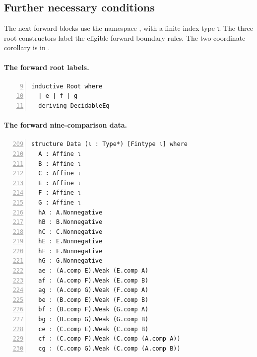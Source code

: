 
\subsection*{Further necessary conditions}

The next forward blocks use the namespace
, with a finite index type
{\leanappendixfont ι}. The three root constructors label the eligible forward
boundary rules. The two-coordinate corollary is in
.

\paragraph{The forward root labels.}\mbox{}\par
{}\par
\begin{Verbatim}[formatcom=\leanappendixfont,fontsize=\scriptsize,numbers=left,firstnumber=9,numbersep=5pt,xleftmargin=18pt]
inductive Root where
  | e | f | g
  deriving DecidableEq
\end{Verbatim}

\paragraph{The forward nine-comparison data.}\mbox{}\par
{}\par
\begin{Verbatim}[formatcom=\leanappendixfont,fontsize=\scriptsize,numbers=left,firstnumber=209,numbersep=5pt,xleftmargin=18pt]
structure Data (ι : Type*) [Fintype ι] where
  A : Affine ι
  B : Affine ι
  C : Affine ι
  E : Affine ι
  F : Affine ι
  G : Affine ι
  hA : A.Nonnegative
  hB : B.Nonnegative
  hC : C.Nonnegative
  hE : E.Nonnegative
  hF : F.Nonnegative
  hG : G.Nonnegative
  ae : (A.comp E).Weak (E.comp A)
  af : (A.comp F).Weak (E.comp B)
  ag : (A.comp G).Weak (F.comp A)
  be : (B.comp E).Weak (F.comp B)
  bf : (B.comp F).Weak (G.comp A)
  bg : (B.comp G).Weak (G.comp B)
  ce : (C.comp E).Weak (C.comp B)
  cf : (C.comp F).Weak (C.comp (A.comp A))
  cg : (C.comp G).Weak (C.comp (A.comp B))
\end{Verbatim}

